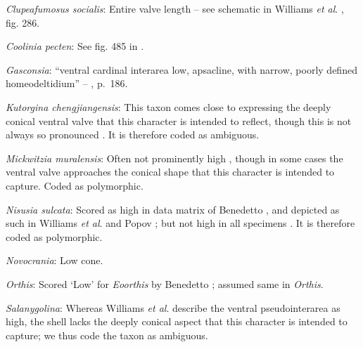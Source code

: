 \documentclass[openany]{book}
\begin{document}
\hypertarget{Clupeafumosus_socialis-coding-111}{}
\emph{Clupeafumosus socialis}: Entire valve length -- see schematic in
Williams \emph{et al}. \citeyearpar{Williams1997Introduction}, fig. 286.

\hypertarget{Coolinia_pecten-coding-111}{}
\emph{Coolinia pecten}: See fig. 485 in
\citet{Williams2000LinguliformeaCraniiformea}.

\hypertarget{Gasconsia-coding-111}{}
\emph{Gasconsia}: ``ventral cardinal interarea low, apsacline, with
narrow, poorly defined homeodeltidium'' --
\citet{Williams2000LinguliformeaCraniiformea}, p.~186.

\hypertarget{Kutorgina_chengjiangensis-coding-111}{}
\emph{Kutorgina chengjiangensis}: This taxon
\citetext{\citealp[see][fig.
129]{Williams2000LinguliformeaCraniiformea}; \citealp[fig.
1]{Popov1992TheCambrian}} comes close to expressing the deeply conical
ventral valve that this character is intended to reflect, though this is
not always so pronounced \citep[e.g.][fig.
125]{Williams2000LinguliformeaCraniiformea}. It is therefore coded as
ambiguous.

\hypertarget{Mickwitzia_muralensis-coding-111}{}
\emph{Mickwitzia muralensis}: Often not prominently high
\citep{Skovsted2003EarlyCambrian, Balthasar2004Shellstructure}, though
in some cases \citep[e.g.][]{Butler2015Exceptionallypreserved} the
ventral valve approaches the conical shape that this character is
intended to capture. Coded as polymorphic.

\hypertarget{Nisusia_sulcata-coding-111}{}
\emph{Nisusia sulcata}: Scored as high in data matrix of Benedetto
\citeyearpar{Benedetto2009iChaniella}, and depicted as such in Williams
\emph{et al}. \citeyearpar[fig.
125]{Williams2000LinguliformeaCraniiformea} and Popov \citeyearpar[fig.
1]{Popov1992TheCambrian}; but not high in all specimens
\citep[e.g.][fig. 126]{Williams2000LinguliformeaCraniiformea}. It is
therefore coded as polymorphic.

\hypertarget{Novocrania-coding-111}{}
\emph{Novocrania}: Low cone.

\hypertarget{Orthis-coding-111}{}
\emph{Orthis}: Scored `Low' for \emph{Eoorthis} by Benedetto
\citeyearpar{Benedetto2009iChaniella}; assumed same in \emph{Orthis}.

\hypertarget{Salanygolina-coding-111}{}
\emph{Salanygolina}: Whereas Williams \emph{et al}.
\citeyearpar[p.~156]{Williams2000LinguliformeaCraniiformea} describe the
ventral pseudointerarea as high, the shell lacks the deeply conical
aspect that this character is intended to capture; we thus code the
taxon as ambiguous.
\end{document}
